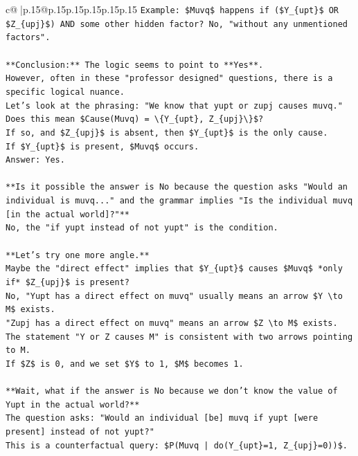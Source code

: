 \documentclass{article}
\begin{document}
{\begin{supertabular}{c@{$\;$}|p{.15\linewidth}@{}p{.15\linewidth}p{.15\linewidth}p{.15\linewidth}p{.15\linewidth}p{.15\linewidth}}
{{{\texttt{Example: \$Muvq\$ happens if (\$Y\_\{upt\}\$ OR \$Z\_\{upj\}\$) AND some other hidden factor? No, "without any unmentioned factors".} \\
\\ 
\texttt{**Conclusion:** The logic seems to point to **Yes**.} \\
\texttt{However, often in these "professor designed" questions, there is a specific logical nuance.} \\
\texttt{Let's look at the phrasing: "We know that yupt or zupj causes muvq."} \\
\texttt{Does this mean \$Cause(Muvq) = \textbackslash{}\{Y\_\{upt\}, Z\_\{upj\}\textbackslash{}\}\$?} \\
\texttt{If so, and \$Z\_\{upj\}\$ is absent, then \$Y\_\{upt\}\$ is the only cause.} \\
\texttt{If \$Y\_\{upt\}\$ is present, \$Muvq\$ occurs.} \\
\texttt{Answer: Yes.} \\
\\ 
\texttt{**Is it possible the answer is No because the question asks "Would an individual is muvq..." and the grammar implies "Is the individual muvq {[}in the actual world{]}?"**} \\
\texttt{No, the "if yupt instead of not yupt" is the condition.} \\
\\ 
\texttt{**Let's try one more angle.**} \\
\texttt{Maybe the "direct effect" implies that \$Y\_\{upt\}\$ causes \$Muvq\$ *only if* \$Z\_\{upj\}\$ is present?} \\
\texttt{No, "Yupt has a direct effect on muvq" usually means an arrow \$Y \textbackslash{}to M\$ exists.} \\
\texttt{"Zupj has a direct effect on muvq" means an arrow \$Z \textbackslash{}to M\$ exists.} \\
\texttt{The statement "Y or Z causes M" is consistent with two arrows pointing to M.} \\
\texttt{If \$Z\$ is 0, and we set \$Y\$ to 1, \$M\$ becomes 1.} \\
\\ 
\texttt{**Wait, what if the answer is No because we don't know the value of Yupt in the actual world?**} \\
\texttt{The question asks: "Would an individual {[}be{]} muvq if yupt {[}were present{]} instead of not yupt?"} \\
\texttt{This is a counterfactual query: \$P(Muvq | do(Y\_\{upt\}=1, Z\_\{upj\}=0))\$.} \\
}}}
\end{supertabular}}
\end{document}
